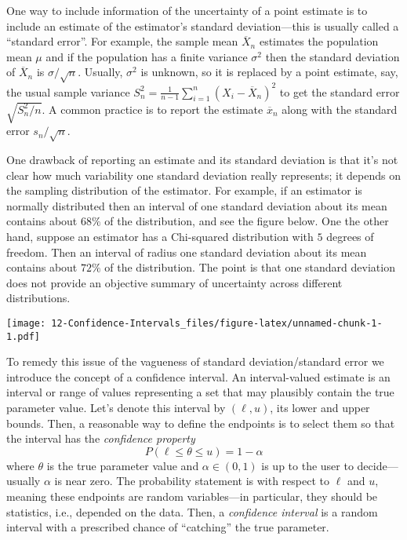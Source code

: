 \documentclass[
]{book}
\begin{document}
One way to include information of the uncertainty of a point estimate is to include an estimate of the estimator's standard deviation---this is usually called a ``standard error''. For example, the sample mean \(\overline X_n\) estimates the population mean \(\mu\) and if the population has a finite variance \(\sigma^2\) then the standard deviation of \(\overline X_n\) is \(\sigma/\sqrt{n}\). Usually, \(\sigma^2\) is unknown, so it is replaced by a point estimate, say, the usual sample variance \(S_n^2 = \frac{1}{n-1}\sum_{i=1}^n (X_i - \overline X_n)^2\) to get the standard error \(\sqrt{S_n^2/n}\). A common practice is to report the estimate \(\overline x_n\) along with the standard error \(s_n/\sqrt{n}\).

One drawback of reporting an estimate and its standard deviation is that it's not clear how much variability one standard deviation really represents; it depends on the sampling distribution of the estimator. For example, if an estimator is normally distributed then an interval of one standard deviation about its mean contains about \(68\%\) of the distribution, and see the figure below. One the other hand, suppose an estimator has a Chi-squared distribution with \(5\) degrees of freedom. Then an interval of radius one standard deviation about its mean contains about \(72\%\) of the distribution. The point is that one standard deviation does not provide an objective summary of uncertainty across different distributions.

\texttt{[image: 12-Confidence-Intervals\_files/figure-latex/unnamed-chunk-1-1.pdf]}

To remedy this issue of the vagueness of standard deviation/standard error we introduce the concept of a confidence interval. An interval-valued estimate is an interval or range of values representing a set that may plausibly contain the true parameter value. Let's denote this interval by \((\ell, u)\), its lower and upper bounds. Then, a reasonable way to define the endpoints is to select them so that the interval has the \emph{confidence property}
\[P(\ell \leq \theta \leq u) = 1-\alpha\]
where \(\theta\) is the true parameter value and \(\alpha \in (0,1)\) is up to the user to decide---usually \(\alpha\) is near zero. The probability statement is with respect to \(\ell\) and \(u\), meaning these endpoints are random variables---in particular, they should be statistics, i.e., depended on the data. Then, a \emph{confidence interval} is a random interval with a prescribed chance of ``catching'' the true parameter.
\end{document}

